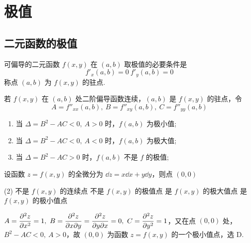 \section{极值}

\subsection{二元函数的极值}

\begin{theorem}[二元函数取极值的必要条件]
    可偏导的二元函数 $f(x,y)$ 在 $(a,b)$ 取极值的必要条件是
    $$f'_x(a,b)=0~  f'_y(a,b)=0$$
    称点 $(a,b)$ 为 $f(x,y)$ 的驻点.
\end{theorem}

\begin{theorem}[二元函数取极值的充分条件]
    若 $f(x,y)$ 在 $(a,b)$ 处二阶偏导函数连续，$(a,b)$ 是 $f(x,y)$ 的驻点，令
    $$A=f''_{xx}(a,b),~  B=f''_{xy}(a,b),~  C=f''_{yy}(a,b)$$
    \begin{enumerate}[label=(\arabic{*})]
        \item 当 $\Delta=B^2-AC<0,~A>0$ 时，$f(a,b)$ 为极小值;
        \item 当 $\Delta=B^2-AC<0,~A<0$ 时，$f(a,b)$ 为极大值;
        \item 当 $\Delta=B^2-AC>0$ 时，$f(a,b)$ 不是 $f$ 的极值;
    \end{enumerate}
\end{theorem}

\begin{example}[2009 数二]
    设函数 $z=f(x,y)$ 的全微分为 $\dd z=x\dd x+y\dd y$，则点 $(0,0)$
    \begin{tasks}(2)
        \task 不是 $f(x,y)$ 的连续点
        \task 不是 $f(x,y)$ 的极值点
        \task 是 $f(x,y)$ 的极大值点
        \task 是 $f(x,y)$ 的极小值点
    \end{tasks}
\end{example}
\begin{solution}
    $\displaystyle A=\pdv[2]{z}{x}=1,~B=\pdv{z}{x}{y}=\pdv{z}{y}{x}=0,~C=\pdv[2]{z}{y}=1$，又在点 $(0,0)$ 处，$B^2-AC<0,~A>0$，故 $(0,0)$ 为函数 $z=f(x,y)$ 的一个极小值点，选 D.
\end{solution}

